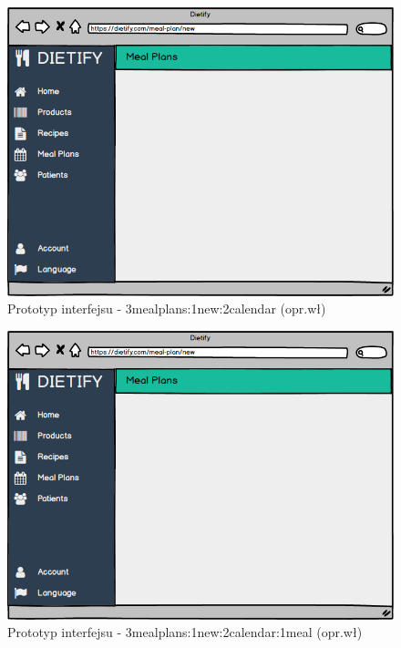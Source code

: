 \begin{minipage}{\textwidth}
    \begin{figure}[H]
        \centering\includegraphics[scale=0.55]{../mockup/3mealplans_1new_2calendar.png}
        \caption{Prototyp interfejsu - 3mealplans:1new:2calendar (opr.wł)}\label{rysunek:3mealplans_1new_2calendar}
    \end{figure}
\end{minipage}
\begin{minipage}{\textwidth}
    \begin{figure}[H]
        \centering\includegraphics[scale=0.55]{../mockup/3mealplans_1new_2calendar_1meal.png}
        \caption{Prototyp interfejsu - 3mealplans:1new:2calendar:1meal (opr.wł)}\label{rysunek:3mealplans_1new_2calendar_1meal}
    \end{figure}
\end{minipage}
